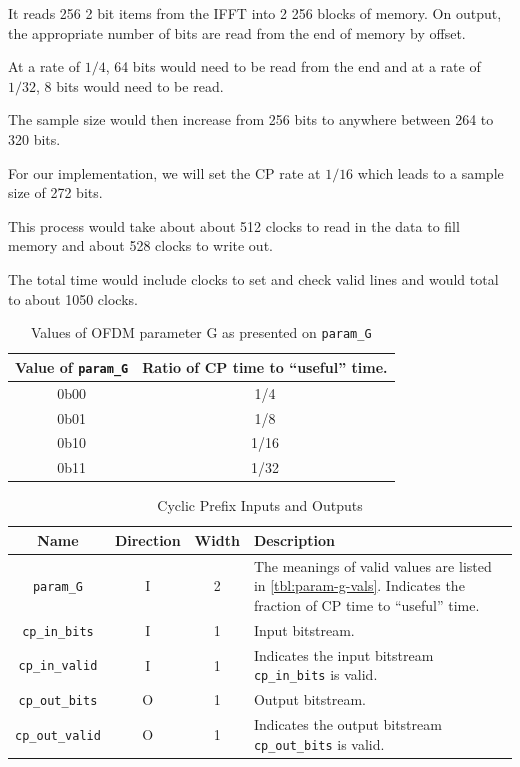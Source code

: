\documentclass[dvips,10pt,twocolumn]{article}
\newcommand{\wire}{\texttt}
\begin{document}
It reads 256 2 bit items from the IFFT into 2 256 blocks of memory.
On output, the appropriate number of bits are read from the end of 
memory by offset.

At a rate of $1/4$, 64 bits would need to be read from the end and 
at a rate of $1/32$, 8 bits would need to be read.

The sample size would then increase from 256 bits to anywhere between
264 to 320 bits.

For our implementation, we will set the CP rate at $1/16$ which leads to
a sample size of 272 bits.

This process would take about about 512 clocks to read in the data to fill
memory and about 528 clocks to write out. 

The total time would include clocks to set and check valid lines and would
total to about 1050 clocks. 

\begin{table}
\begin{tabulary}{\linewidth}{C|C}
	\label{tbl:param-g-vals}
	Value of \wire{param\_G} & Ratio of CP time to
	``useful'' time. \\ \hline

	0b00 & 1/4 \\
	0b01 & 1/8 \\
	0b10 & 1/16 \\
	0b11 & 1/32 \\

\end{tabulary}
\caption{Values of OFDM parameter G as presented on
\wire{param\_G}}
\end{table}

\begin{table}
\begin{tabularx}{\linewidth}{c|c|c|X}
	\label{tbl:cp-io}
	Name & Direction & Width & Description \\ \hline

	\wire{param\_G} & I & 2 & The meanings of valid values
	are listed in \autoref{tbl:param-g-vals}. Indicates the
	fraction of CP time to ``useful'' time.
	\\

	\wire{cp\_in\_bits} & I & 1 & Input bitstream. \\
	
	\wire{cp\_in\_valid} & I & 1 & Indicates the input
	bitstream \wire{cp\_in\_bits} is valid. \\

	\wire{cp\_out\_bits} & O & 1 & Output bitstream. \\

	\wire{cp\_out\_valid} & O & 1 & Indicates the output
	bitstream \wire{cp\_out\_bits} is valid.
\end{tabularx}
\caption{Cyclic Prefix Inputs and Outputs}
\end{table}
\end{document}
